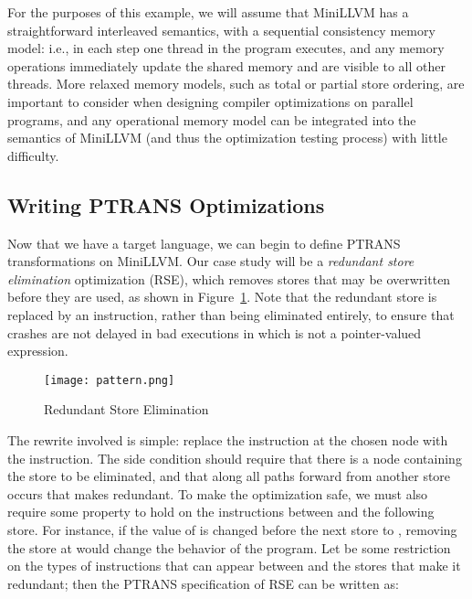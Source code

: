 \documentclass{eptcs}
\newcommand{\ptrans}[0]{PTRANS}
\begin{document}
For the purposes of this example, we will assume that MiniLLVM has a straightforward interleaved semantics, with a sequential consistency memory model: i.e., in each step one thread in the program executes, and any memory operations immediately update the shared memory and are visible to all other threads. More relaxed memory models, such as total or partial store ordering, are important to consider when designing compiler optimizations on parallel programs, and any operational memory model can be integrated into the semantics of MiniLLVM (and thus the optimization testing process) with little difficulty.

\subsection{Writing {\ptrans} Optimizations}
\label{opts}
Now that we have a target language, we can begin to define {\ptrans} transformations on MiniLLVM. Our case study will be a \emph{redundant store elimination} optimization (RSE), which removes stores that may be overwritten before they are used, as shown in Figure~\ref{pattern}. Note that the redundant store is replaced by an  instruction, rather than being eliminated entirely, to ensure that crashes are not delayed in bad executions in which  is not a pointer-valued expression.
\begin{figure}[htbp]
\centering
\texttt{[image: pattern.png]}
\caption{Redundant Store Elimination}
\label{pattern}
\end{figure}

The rewrite involved is simple: replace the instruction at the chosen node with the  instruction. The side condition should require that there is a node  containing the store to be eliminated, and that along all paths forward from  another store occurs that makes  redundant. To make the optimization safe, we must also require some property to hold on the instructions between  and the following store. For instance, if the value of  is changed before the next store to , removing the store at  would change the behavior of the program. Let  be some restriction on the types of instructions that can appear between  and the stores that make it redundant; then the {\ptrans} specification of RSE can be written as:
\end{document}
